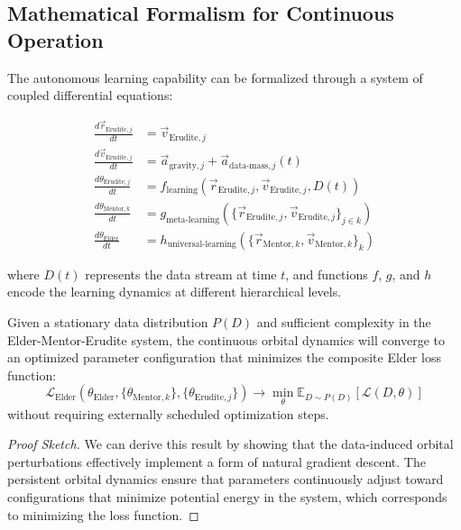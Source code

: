 \subsection{Mathematical Formalism for Continuous Operation}

The autonomous learning capability can be formalized through a system of coupled differential equations:

\begin{align}
\frac{d\vec{r}_{\text{Erudite},j}}{dt} &= \vec{v}_{\text{Erudite},j} \\
\frac{d\vec{v}_{\text{Erudite},j}}{dt} &= \vec{a}_{\text{gravity},j} + \vec{a}_{\text{data-mass},j}(t) \\
\frac{d\theta_{\text{Erudite},j}}{dt} &= f_{\text{learning}}(\vec{r}_{\text{Erudite},j}, \vec{v}_{\text{Erudite},j}, D(t)) \\
\frac{d\theta_{\text{Mentor},k}}{dt} &= g_{\text{meta-learning}}(\{\vec{r}_{\text{Erudite},j}, \vec{v}_{\text{Erudite},j}\}_{j \in k}) \\
\frac{d\theta_{\text{Elder}}}{dt} &= h_{\text{universal-learning}}(\{\vec{r}_{\text{Mentor},k}, \vec{v}_{\text{Mentor},k}\}_k)
\end{align}

where $D(t)$ represents the data stream at time $t$, and functions $f$, $g$, and $h$ encode the learning dynamics at different hierarchical levels.

\begin{theorem}
Given a stationary data distribution $P(D)$ and sufficient complexity in the Elder-Mentor-Erudite system, the continuous orbital dynamics will converge to an optimized parameter configuration that minimizes the composite Elder loss function:
\begin{equation}
\mathcal{L}_{\text{Elder}}(\theta_{\text{Elder}}, \{\theta_{\text{Mentor},k}\}, \{\theta_{\text{Erudite},j}\}) \to \min_{\theta} \mathbb{E}_{D \sim P(D)}[\mathcal{L}(D, \theta)]
\end{equation}
without requiring externally scheduled optimization steps.
\end{theorem}

\begin{proof}[Proof Sketch]
We can derive this result by showing that the data-induced orbital perturbations effectively implement a form of natural gradient descent. The persistent orbital dynamics ensure that parameters continuously adjust toward configurations that minimize potential energy in the system, which corresponds to minimizing the loss function.
\end{proof}

